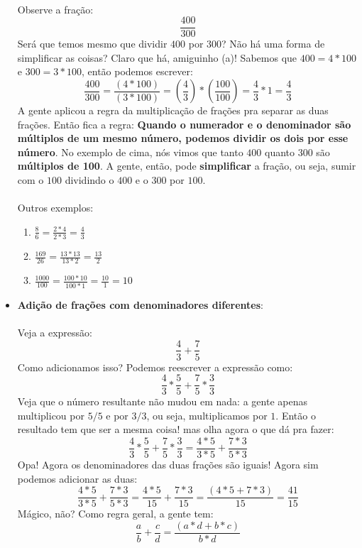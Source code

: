 \documentclass{article}
\begin{document}
\begin{itemize}
	\paragraph{}
	Observe a fração:
	$$\frac{400}{300}$$
	Será que temos mesmo que dividir $400$ por $300$? Não há uma forma de 
	simplificar as coisas? Claro que há, amiguinho (a)! Sabemos que 
	$400 = 4*100$ e $300 = 3*100$, então podemos escrever:
	$$\frac{400}{300} = \frac{(4*100)}{(3*100)} = 
	(\frac{4}{3})*(\frac{100}{100}) = \frac{4}{3}*1 = \frac{4}{3}$$
	A gente aplicou a regra da multiplicação de frações pra separar as duas
	frações. Então fica a regra: \textbf{Quando o numerador e o denominador
	são múltiplos de um mesmo número, podemos dividir os dois por esse número}.
	No exemplo de cima, nós vimos que tanto $400$ quanto $300$ são 
	\textbf{múltiplos de 100}. A gente, então, pode \textbf{simplificar} 
	a fração, ou seja, sumir com o $100$ dividindo o $400$ e o $300$ por $100$.
	\paragraph{}
	Outros exemplos:
	\begin{enumerate}
		\item $\frac{8}{6} = \frac{2*4}{2*3} = \frac{4}{3}$
		\item $\frac{169}{26} = \frac{13*13}{13*2} = \frac{13}{2}$
		\item $\frac{1000}{100} = \frac{100*10}{100*1} = \frac{10}{1} = 10$
	\end{enumerate}
	\item \textbf{Adição de frações com denominadores diferentes}:
	\paragraph{}
	Veja a expressão:
	$$\frac{4}{3} + \frac{7}{5}$$
	Como adicionamos isso? Podemos reescrever a expressão como:
	$$\frac{4}{3}*\frac{5}{5} + \frac{7}{5}*\frac{3}{3}$$
	Veja que o número resultante não mudou em nada: a gente apenas multiplicou
	por $5/5$ e por $3/3$, ou seja, multiplicamos por $1$. Então o resultado
	tem que ser a mesma coisa! mas olha agora o que dá pra fazer:
	$$\frac{4}{3}*\frac{5}{5} + \frac{7}{5}*\frac{3}{3} = \frac{4*5}{3*5} + 
	\frac{7*3}{5*3}$$
	Opa! Agora os denominadores das duas frações são iguais! Agora sim podemos
	adicionar as duas:
	$$\frac{4*5}{3*5} + \frac{7*3}{5*3} = \frac{4*5}{15} + \frac{7*3}{15} =
	\frac{(4*5 + 7*3)}{15} = \frac{41}{15}$$
	Mágico, não? Como regra geral, a gente tem:
	$$\frac{a}{b} + \frac{c}{d} = \frac{(a*d + b*c)}{b*d}$$
\end{itemize}
\end{document}
